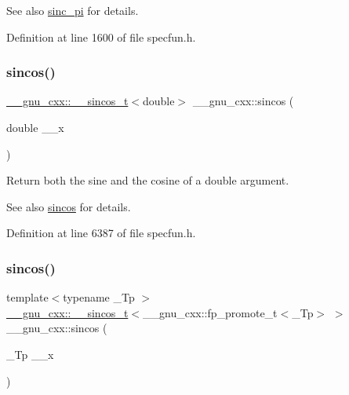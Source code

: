 \begin{DoxySeeAlso}{See also}
\hyperlink{group__gnu__math__spec__func_ga5195270024403b985e7d4f2f935f8779}{sinc\+\_\+pi} for details. 
\end{DoxySeeAlso}


Definition at line 1600 of file specfun.\+h.

\mbox{\label{group__gnu__math__spec__func_ga8041c24b528475bcf8a4178e484652a3}} 
\subsubsection{\texorpdfstring{sincos()}{sincos()}\hspace{0.1cm}{\footnotesize\ttfamily [1/2]}}
{\footnotesize\ttfamily \hyperlink{struct____gnu__cxx_1_1____sincos__t}{\+\_\+\+\_\+gnu\+\_\+cxx\+::\+\_\+\+\_\+sincos\+\_\+t}$<$double$>$ \+\_\+\+\_\+gnu\+\_\+cxx\+::sincos (\begin{DoxyParamCaption}\item[{double}]{\+\_\+\+\_\+x }\end{DoxyParamCaption})\hspace{0.3cm}{\ttfamily [inline]}}

Return both the sine and the cosine of a {\ttfamily double} argument.

\begin{DoxySeeAlso}{See also}
\hyperlink{group__gnu__math__spec__func_ga8041c24b528475bcf8a4178e484652a3}{sincos} for details. 
\end{DoxySeeAlso}


Definition at line 6387 of file specfun.\+h.

\mbox{\label{group__gnu__math__spec__func_ga5d3a375ada451e0a9a78441ddfcf52a3}} 
\subsubsection{\texorpdfstring{sincos()}{sincos()}\hspace{0.1cm}{\footnotesize\ttfamily [2/2]}}
{\footnotesize\ttfamily template$<$typename \+\_\+\+Tp $>$ \\
\hyperlink{struct____gnu__cxx_1_1____sincos__t}{\+\_\+\+\_\+gnu\+\_\+cxx\+::\+\_\+\+\_\+sincos\+\_\+t}$<$\+\_\+\+\_\+gnu\+\_\+cxx\+::fp\+\_\+promote\+\_\+t$<$\+\_\+\+Tp$>$ $>$ \+\_\+\+\_\+gnu\+\_\+cxx\+::sincos (\begin{DoxyParamCaption}\item[{\+\_\+\+Tp}]{\+\_\+\+\_\+x }\end{DoxyParamCaption})\hspace{0.3cm}{\ttfamily [inline]}}

